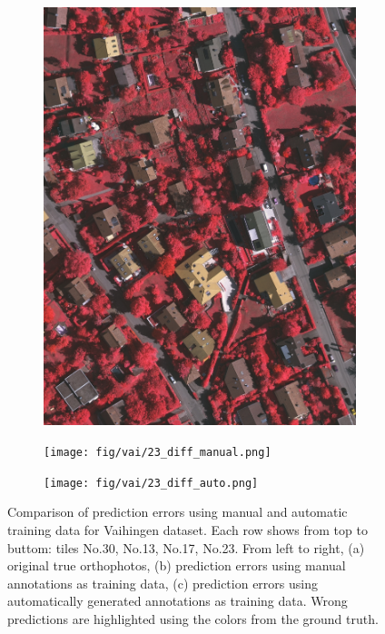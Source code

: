 \begin{figure}[H]
\begin{subfigure}{0.325\columnwidth}
  \includegraphics[width=1\linewidth]{fig/vai/23.JPG} 
  \caption{}
\end{subfigure}\vspace{1mm}
\begin{subfigure}{0.325\columnwidth}
  \centering
  \texttt{[image: fig/vai/23\_diff\_manual.png]}
  \caption{}
\end{subfigure}
\begin{subfigure}{0.325\columnwidth}
  \centering
  \texttt{[image: fig/vai/23\_diff\_auto.png]}
  \caption{}
\end{subfigure}
\caption{Comparison of prediction errors using manual and automatic training data for Vaihingen dataset. Each row shows from top to buttom: tiles No.30, No.13, No.17, No.23. From left to right, (a) original true orthophotos, (b) prediction errors using manual annotations as training data, (c) prediction errors using automatically generated annotations as training data. Wrong predictions are highlighted using the colors from the ground truth.}
\label{fig:vai_seg_error}
\end{figure}
